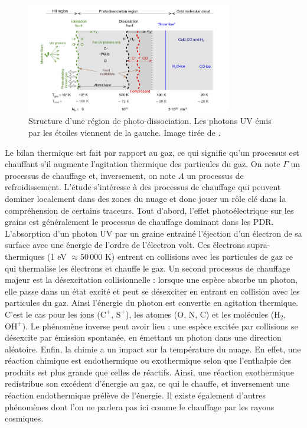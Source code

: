 \documentclass[11pt,a4paper]{article}
\begin{document}
\begin{spacing}{0.98}
\begin{figure}[!h]
    \centering
    \includegraphics[width = 0.8\textwidth]{figure/structurepdr.pdf}
    \caption{Structure d'une région de photo-dissociation. Les photons UV émis par les étoiles viennent de la gauche. Image tirée de \cite{Goicoechea2016}.}
    \label{fig:intro:struct}
\end{figure}
 \newline

Le bilan thermique est fait par rapport au gaz, ce qui signifie qu'un processus est chauffant s'il augmente l'agitation thermique des particules du gaz. On note $\Gamma$ un processus de chauffage et, inversement, on note $\Lambda$ un processus de refroidissement. L'étude s'intéresse à des processus de chauffage qui peuvent dominer localement dans des zones du nuage et donc jouer un rôle clé dans la compréhension de certains traceurs. Tout d'abord, l'effet photoélectrique sur les grains est généralement le processus de chauffage dominant dans les PDR. L'absorption d'un photon UV par un graine entrainé l'éjection d'un électron de sa surface avec une énergie de l'ordre de l'électron volt. Ces électrons supra-thermiques (1 eV $\approx 50\,000$ K) entrent en collisions avec les particules de gaz ce qui thermalise les électrons et chauffe le gaz. Un second processus de chauffage majeur est la désexcitation collisionnelle : lorsque une espèce absorbe un photon, elle passe dans un état excité et peut se désexciter en entrant en collision avec les particules du gaz. Ainsi l'énergie du photon est convertie en agitation thermique. C'est le cas pour les ions ($\mathrm{C}^+$, $\mathrm{S}^+$), les atomes ($\mathrm{O}$, $\mathrm{N}$, $\mathrm{C}$) et les molécules ($\mathrm{H}_2$, $\mathrm{OH}^+$). Le phénomène inverse peut avoir lieu : une espèce excitée par collisions se désexcite par émission spontanée, en émettant un photon dans une direction aléatoire. Enfin, la chimie a un impact sur la température du nuage. En effet, une réaction chimique est endothermique ou exothermique selon que l’enthalpie des produits est plus grande que celles de réactifs. Ainsi, une réaction exothermique redistribue son excédent d'énergie au gaz, ce qui le chauffe, et inversement une réaction endothermique prélève de l'énergie. Il existe également d'autres phénomènes dont l'on ne parlera pas ici comme le chauffage par les rayons cosmiques. \newline 


\end{spacing}
\end{document}

